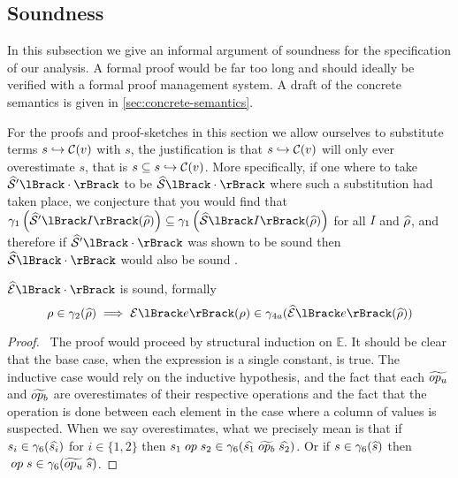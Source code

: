 \subsection{Soundness}\label{subsec:soundness}

In this subsection we give an informal argument of soundness for the specification of our analysis.
A formal proof would be far too long and should ideally be verified with a formal proof management system.
A draft of the concrete semantics is given in \autoref{sec:concrete-semantics}.

For the proofs and proof-sketches in this section we allow ourselves to substitute terms $s \hookrightarrow \mathcal{C}(v)$ with $s$, the justification is that $s \hookrightarrow \mathcal{C}(v)$ will only ever overestimate $s$, that is $s \subseteq s \hookrightarrow \mathcal{C}(v)$.
More specifically, if one where to take $\ab{\mathcal{S}}'\lBrack\cdot\rBrack$ to be $\abssem{\cdot}$ where such a substitution had taken place, we conjecture that you would find that $\concrete_1 \left( \ab{\mathcal{S}}'\lBrack I \rBrack (\ab{\environment})\right) \subseteq \concrete_1 \left( \abssem{I}(\ab{\environment}) \right)$ for all $I$ and $\widehat{\rho}$, and therefore if $\ab{\mathcal{S}}'\lBrack \cdot \rBrack$ was shown to be sound then $\abssem{\cdot}$ would also be sound .

\begin{conjecture}\label{thm:sound-exp}
    $\absexpsem{\cdot}$ is sound, formally
    \begin{equation*}
        \environment \in \concrete_2(\ab{\environment}) \implies \expsem{e}(\environment) \in \concrete_{4a}(\absexpsem{e}(\ab{\environment}))
    \end{equation*}
\end{conjecture}

\begin{proof}
    \pfsketch\
    The proof would proceed by structural induction on $\mathbb{E}$.
    It should be clear that the base case, when the expression is a single constant, is true.
    The inductive case would rely on the inductive hypothesis, and the fact that each $\widetilde{op_u}$ and $\widetilde{op_b}$ are overestimates of their respective operations and the fact that the operation is done between each element in the case where a column of values is suspected.
    When we say overestimates, what we precisely mean is that if $s_i \in \gamma_6(\widehat{s_i})$ for $i \in \{1, 2\}$ then $s_1 \;op\; s_2 \in \gamma_6(\widehat{s_1} \; \widetilde{op_b} \; \widehat{s_2})$.
    Or if $s \in \gamma_6(\widehat{s})$ then $\;op\; s \in \gamma_6(\widetilde{op_u} \; \widehat{s})$.
\end{proof}


